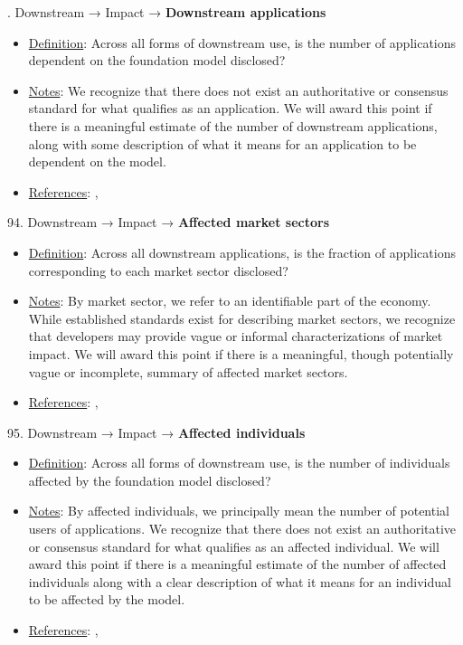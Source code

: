 . Downstream → Impact → \textbf{Downstream applications}
\vspace{-\parskip}
\begin{itemize}
\item
\underline{Definition}: Across all forms of downstream use, is the number of applications dependent on the foundation model disclosed?
\item
\underline{Notes}: We recognize that there does not exist an authoritative or consensus standard for what qualifies as an application. We will award this point if there is a meaningful estimate of the number of downstream applications, along with some description of what it means for an application to be dependent on the model.
\item
\underline{References}: \citet{vipra2023concentration}, \citet{bommasani2023ecosystem}
\end{itemize} \vspace{\baselineskip}


94. Downstream → Impact → \textbf{Affected market sectors}
\vspace{-\parskip}
\begin{itemize}
\item
\underline{Definition}: Across all downstream applications, is the fraction of applications corresponding to each market sector disclosed?
\item
\underline{Notes}: By market sector, we refer to an identifiable part of the economy. While established standards exist for describing market sectors, we recognize that developers may provide vague or informal characterizations of market impact. We will award this point if there is a meaningful, though potentially vague or incomplete, summary of affected market sectors.
\item
\underline{References}: \citet{vipra2023concentration}, \citet{bommasani2023ecosystem}
\end{itemize} \vspace{\baselineskip}


95. Downstream → Impact → \textbf{Affected individuals}
\vspace{-\parskip}
\begin{itemize}
\item
\underline{Definition}: Across all forms of downstream use, is the number of individuals affected by the foundation model disclosed?
\item
\underline{Notes}: By affected individuals, we principally mean the number of potential users of applications. We recognize that there does not exist an authoritative or consensus standard for what qualifies as an affected individual. We will award this point if there is a meaningful estimate of the number of affected individuals along with a clear description of what it means for an individual to be affected by the model.
\item
\underline{References}: \citet{vipra2023concentration}, \citet{bommasani2023ecosystem}
\end{itemize} \vspace{\baselineskip}



